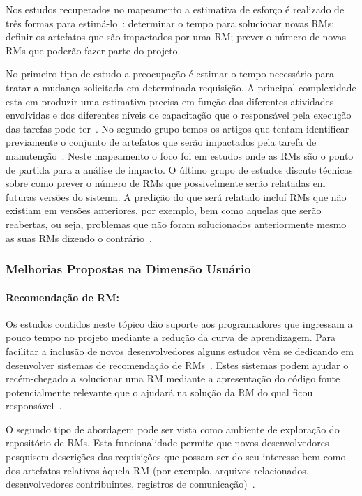Nos estudos recuperados no mapeamento a estimativa de esforço é realizado de
três formas para estimá-lo~\cite{cavalcanti2014challenges}: determinar o tempo
para solucionar novas RMs; definir os artefatos que são impactados por uma
RM\@; prever o número de novas RMs que poderão fazer parte do projeto.

No primeiro tipo de estudo a preocupação é estimar o tempo necessário para
tratar a mudança solicitada em determinada requisição. A principal complexidade
esta em produzir uma estimativa precisa em função das diferentes atividades
envolvidas e dos diferentes níveis de capacitação que o responsável pela
execução das tarefas pode ter~\cite{xia2015automatic}. No segundo grupo temos os
artigos que tentam identificar previamente o conjunto de artefatos que serão
impactados pela tarefa de manutenção~\cite{Nagwani2010}.  Neste mapeamento o
foco foi em estudos onde as RMs são o ponto de partida para a análise de
impacto. O último grupo de estudos discute técnicas sobre como prever o número
de RMs que possivelmente serão relatadas em futuras versões do sistema. A
predição do que será relatado incluí RMs que não existiam em versões
anteriores, por exemplo, bem como aquelas que serão reabertas, ou seja,
problemas que não foram solucionados anteriormente mesmo as suas RMs dizendo o
contrário~\cite{xia2015automatic}.

\subsubsection{Melhorias Propostas na Dimensão Usuário}
\label{ssub:melhorias_dim_usuario}

\paragraph{Recomendação de RM:} Os estudos contidos neste tópico dão suporte aos
programadores que ingressam a pouco tempo no projeto mediante a redução da curva
de aprendizagem. Para facilitar a inclusão de novos desenvolvedores alguns
estudos vêm se dedicando em desenvolver sistemas de recomendação de
RMs~\cite{malheiros2012source, Wang2011bug}. Estes sistemas podem ajudar o
recém-chegado a solucionar uma RM mediante a apresentação do código fonte
potencialmente relevante que o ajudará na solução da RM do qual ficou
responsável~\cite{malheiros2012source}.

O segundo tipo de abordagem pode ser vista como ambiente de exploração do
repositório de RMs. Esta funcionalidade permite que novos desenvolvedores
pesquisem descrições das requisições que possam ser do seu interesse bem como
dos artefatos relativos àquela RM (por exemplo, arquivos relacionados,
desenvolvedores contribuintes, registros de comunicação)~\cite{Wang2011bug}.

